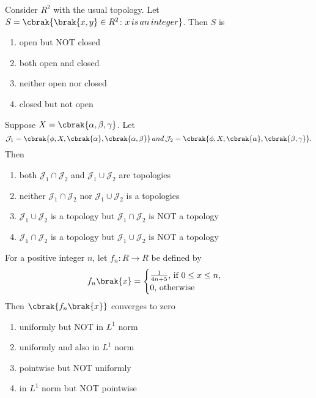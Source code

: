  \iffalse
\chapter{2007}
\author{EE24BTECH11021 - Eshan Ray}
\section{ma}
\fi
  \item Consider $R^2$ with the usual topology. Let $S=\cbrak{\brak{x,y}\in R^2\colon x\, is\, an\, integer}$. Then $S $ is 
    \begin{enumerate}
        \item open but NOT closed
        \item both open and closed
        \item neither open nor closed
        \item closed but not open
    \end{enumerate}
    \item Suppose $X=\cbrak{\alpha,\beta,\gamma}$. Let
    $$\mathcal{J}_1=\cbrak{\phi,X,\cbrak{\alpha},\cbrak{\alpha,\beta}}\,and\, \mathcal{J}_2= \cbrak{\phi,X,\cbrak{\alpha},\cbrak{\beta,\gamma}}.$$
    Then
    \begin{enumerate}
        \item both $\mathcal{J}_1\cap\mathcal{J}_2$ and $\mathcal{J}_1\cup \mathcal{J}_2$ are topologies
        \item neither $\mathcal{J}_1\cap\mathcal{J}_2$ nor $\mathcal{J}_1\cup \mathcal{J}_2$ is a  topologies
        \item $\mathcal{J}_1\cup \mathcal{J}_2$ is a topology but $\mathcal{J}_1\cap\mathcal{J}_2$ is NOT a topology
        \item  $\mathcal{J}_1\cap\mathcal{J}_2$ is a topology but $\mathcal{J}_1\cup \mathcal{J}_2$ is NOT a  topology
    \end{enumerate}
    \item For a positive integer $n$, let $f_n\colon R\to R$ be defined by \\
    $$f_n\brak{x}=
    \begin{cases}
    \frac{1}{4n+5} \text{, if } 0\leq x\leq n,\\
    0 \text{, otherwise}
    \end{cases}
    $$
    Then $\cbrak{f_n\brak{x}}$ converges to zero 
        \begin{enumerate}
            \item uniformly but NOT in $L^1$ norm
            \item uniformly and also in $L^1$ norm
            \item pointwise but NOT uniformly
            \item in $L^1$ norm but NOT pointwise
        \end{enumerate}
